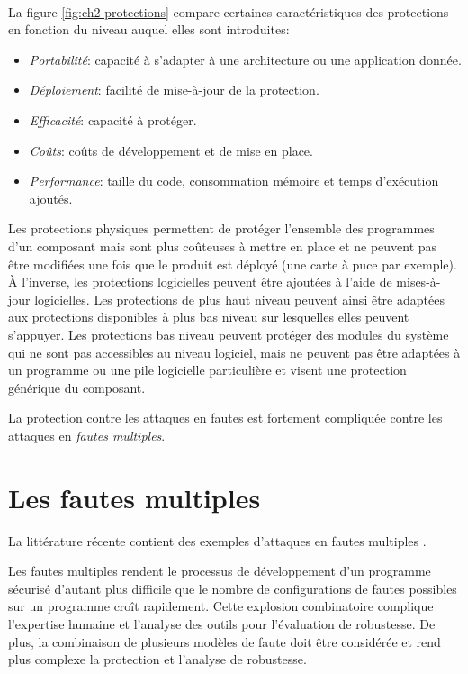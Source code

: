        \paragraph{} La figure \ref{fig:ch2-protections} compare certaines caractéristiques des protections en fonction du niveau auquel elles sont introduites: 
        \begin{itemize}
            \item \textit{Portabilité}: capacité à s'adapter à une architecture ou une application donnée.
            \item \textit{Déploiement}: facilité de mise-à-jour de la protection.
            \item \textit{Efficacité}: capacité à protéger.
            \item \textit{Coûts}: coûts de développement et de mise en place.
            \item \textit{Performance}: taille du code, consommation mémoire et temps d'exécution ajoutés.
        \end{itemize}         
        
        Les protections physiques permettent de protéger l'ensemble des programmes d'un composant mais sont plus coûteuses à mettre en place et ne peuvent pas être modifiées une fois que le produit est déployé (une carte à puce par exemple). 	\`A l'inverse, les protections logicielles peuvent être ajoutées à l'aide de mises-à-jour logicielles. 
        Les protections de plus haut niveau peuvent ainsi être adaptées aux protections disponibles à plus bas niveau sur lesquelles elles peuvent s'appuyer.  
        Les protections bas niveau peuvent protéger des modules du système qui ne sont pas accessibles au niveau logiciel, mais ne peuvent pas être adaptées à un programme ou une pile logicielle particulière et visent une protection générique du composant.
        
        La protection contre les attaques en fautes est fortement compliquée contre les attaques en \textit{fautes multiples}.
     
    \section{Les fautes multiples}
    \label{sec:multi-fault}
        
        La littérature récente contient des exemples d'attaques en fautes multiples \cite{kim2007fault, Barenghi/IEEE2012, Natella/ACM16, SSTIC20}.
        
        Les fautes multiples rendent le processus de développement d'un programme sécurisé d'autant plus difficile que le nombre de configurations de fautes possibles sur un programme croît rapidement. Cette explosion combinatoire complique l'expertise humaine et l'analyse des outils pour l'évaluation de robustesse.
        De plus, la combinaison de plusieurs modèles de faute doit être considérée et rend plus complexe la protection et l'analyse de robustesse.
        
